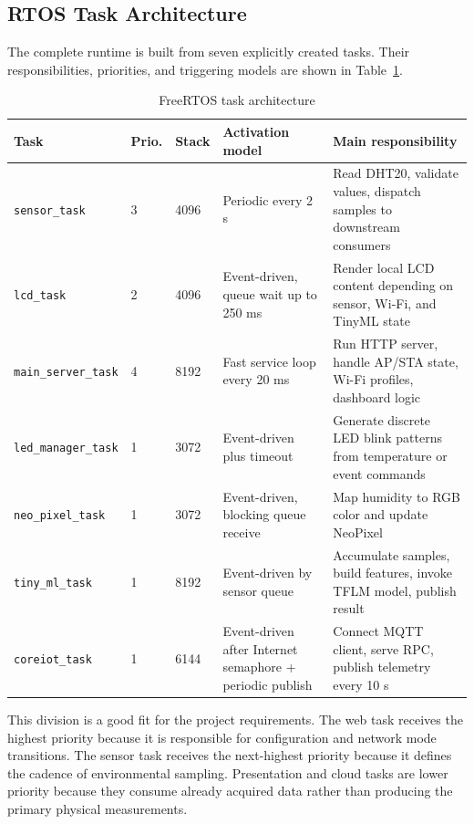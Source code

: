 \subsection{RTOS Task Architecture}
The complete runtime is built from seven explicitly created tasks. Their
responsibilities, priorities, and triggering models are shown in
Table~\ref{tab:task-architecture}.

\begin{table}[H]
\centering
\caption{FreeRTOS task architecture}
\label{tab:task-architecture}
\begin{tabular}{p{3cm}p{1cm}p{1.8cm}p{3.5cm}p{5.2cm}}
\toprule
\textbf{Task} & \textbf{Prio.} & \textbf{Stack} & \textbf{Activation model} & \textbf{Main responsibility} \\
\midrule
\texttt{sensor\_task} & 3 & 4096 & Periodic every 2 s & Read DHT20, validate values, dispatch samples to downstream consumers \\
\texttt{lcd\_task} & 2 & 4096 & Event-driven, queue wait up to 250 ms & Render local LCD content depending on sensor, Wi-Fi, and TinyML state \\
\texttt{main\_server\_task} & 4 & 8192 & Fast service loop every 20 ms & Run HTTP server, handle AP/STA state, Wi-Fi profiles, dashboard logic \\
\texttt{led\_manager\_task} & 1 & 3072 & Event-driven plus timeout & Generate discrete LED blink patterns from temperature or event commands \\
\texttt{neo\_pixel\_task} & 1 & 3072 & Event-driven, blocking queue receive & Map humidity to RGB color and update NeoPixel \\
\texttt{tiny\_ml\_task} & 1 & 8192 & Event-driven by sensor queue & Accumulate samples, build features, invoke TFLM model, publish result \\
\texttt{coreiot\_task} & 1 & 6144 & Event-driven after Internet semaphore + periodic publish & Connect MQTT client, serve RPC, publish telemetry every 10 s \\
\bottomrule
\end{tabular}
\end{table}

This division is a good fit for the project requirements. The web task receives
the highest priority because it is responsible for configuration and network
mode transitions. The sensor task receives the next-highest priority because it
defines the cadence of environmental sampling. Presentation and cloud tasks are
lower priority because they consume already acquired data rather than producing
the primary physical measurements.

